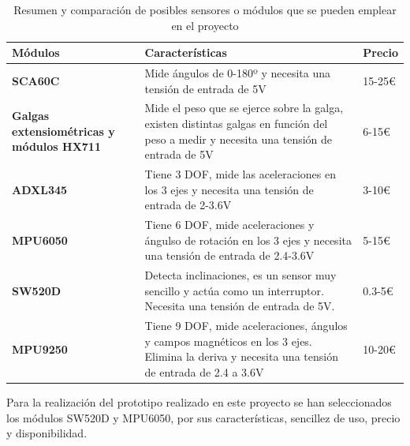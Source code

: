 \begin{table}[h!]
\centering
\begin{tabular}{ |m{4cm}|m{8cm}|m{2cm}|  } 
\hline
\cellcolor[HTML]{B9E3F0}\textbf{Módulos} & \cellcolor[HTML]{B9E3F0}\textbf{Características} & \cellcolor[HTML]{B9E3F0}\textbf{Precio}\\

\hline
\cellcolor[HTML]{EFEFEF}\textbf{SCA60C}             & {Mide ángulos de 0-180º y necesita una tensión de entrada de 5V}   & 15-25€\\
\hline
\cellcolor[HTML]{EFEFEF}\textbf{Galgas extensiométricas y módulos HX711}                & {Mide el peso que se ejerce sobre la galga, existen distintas galgas en función del peso a medir y necesita una tensión de entrada de 5V} & 6-15€\\
\hline
\cellcolor[HTML]{EFEFEF}\textbf{ADXL345}                & {Tiene 3 DOF, mide las aceleraciones en los 3 ejes y necesita una tensión de entrada de 2-3.6V} & 3-10€\\
\hline
\cellcolor[HTML]{EFEFEF}\textbf{MPU6050}                & {Tiene 6 DOF, mide aceleraciones y ángulso de rotación en los 3 ejes y necesita una tensión de entrada de 2.4-3.6V} & 5-15€\\
\hline
\cellcolor[HTML]{EFEFEF}\textbf{SW520D}                & {Detecta inclinaciones, es un sensor muy sencillo y actúa como un interruptor. Necesita una tensión de entrada de 5V.} & 0.3-5€\\
\hline
\cellcolor[HTML]{EFEFEF}\textbf{MPU9250}                & {Tiene 9 DOF, mide aceleraciones, ángulos y campos magnéticos en los 3 ejes. Elimina la deriva y necesita una tensión de entrada de 2.4 a 3.6V} & 10-20€\\
\hline
\end{tabular}
\caption{Resumen y comparación de posibles sensores o módulos que se pueden emplear en el proyecto}
\end{table}



Para la realización del prototipo realizado en este proyecto se han seleccionados los módulos SW520D y MPU6050, por sus características, sencillez de uso, precio y disponibilidad. 